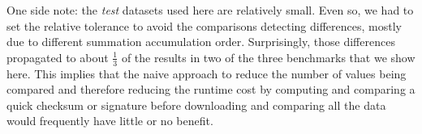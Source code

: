One side note: the \emph{test} datasets used here are relatively small.
Even so, we had to set the relative tolerance to avoid the comparisons detecting differences, mostly due to different summation accumulation order.
Surprisingly, those differences propagated to about $\frac{1}{3}$ of the results in two of the three benchmarks that we show here.
This implies that the naive approach to reduce the number of values being compared and therefore reducing the runtime cost by computing and comparing a quick checksum or signature before downloading and comparing all the data would frequently have little or no benefit.

